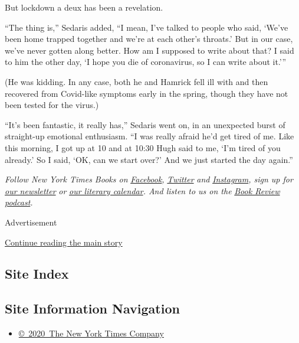 But lockdown a deux has been a revelation.

``The thing is,'' Sedaris added, ``I mean, I've talked to people who
said, `We've been home trapped together and we're at each other's
throats.' But in our case, we've never gotten along better. How am I
supposed to write about that? I said to him the other day, `I hope you
die of coronavirus, so I can write about it.'''

(He was kidding. In any case, both he and Hamrick fell ill with and then
recovered from Covid-like symptoms early in the spring, though they have
not been tested for the virus.)

``It's been fantastic, it really has,'' Sedaris went on, in an
unexpected burst of straight-up emotional enthusiasm. ``I was really
afraid he'd get tired of me. Like this morning, I got up at 10 and at
10:30 Hugh said to me, `I'm tired of you already.' So I said, `OK, can
we start over?' And we just started the day again.''

\emph{Follow New York Times Books on}
\href{https://www.facebook.com/nytbooks/}{\emph{Facebook}}\emph{,}
\href{https://twitter.com/nytimesbooks}{\emph{Twitter}} \emph{and}
\href{https://www.instagram.com/nytbooks/}{\emph{Instagram}}\emph{, sign
up for}
\href{https://www.nytimes.com/newsletters/books-review}{\emph{our
newsletter}} \emph{or}
\href{https://www.nytimes.com/interactive/2017/books/books-calendar.html}{\emph{our
literary calendar}}\emph{. And listen to us on the}
\href{https://www.nytimes.com/column/book-review-podcast}{\emph{Book
Review podcast}}\emph{.}

Advertisement

\protect\hyperlink{after-bottom}{Continue reading the main story}

\hypertarget{site-index}{%
\subsection{Site Index}\label{site-index}}

\hypertarget{site-information-navigation}{%
\subsection{Site Information
Navigation}\label{site-information-navigation}}

\begin{itemize}
\tightlist
\item
  \href{https://help.nytimes.com/hc/en-us/articles/115014792127-Copyright-notice}{©~2020~The
  New York Times Company}
\end{itemize}

